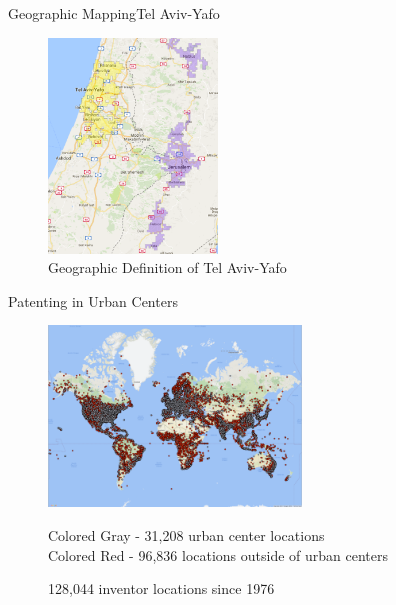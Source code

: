 \documentclass{beamer}
\begin{document}
\begin{frame}{Geographic Mapping}{Tel Aviv-Yafo}
\begin{figure}[h!]
\begin{centering}
  \includegraphics[width=0.4\textwidth]{TelAviv}
  \caption{Geographic Definition of Tel Aviv-Yafo}
   \label{fig:TelAviv}
\end{centering}
\end{figure}
\end{frame}

\begin{frame}{Patenting in Urban Centers}{}
\begin{figure}[h!]
\begin{centering}
  \includegraphics[width=0.6\textwidth]{World}
  \caption{128,044 inventor locations since 1976}
   Colored Gray - 31,208 urban center locations \\
   Colored Red - 96,836 locations outside of urban centers
   \label{fig:World}
\end{centering}
\end{figure}
\end{frame}
\end{document}
